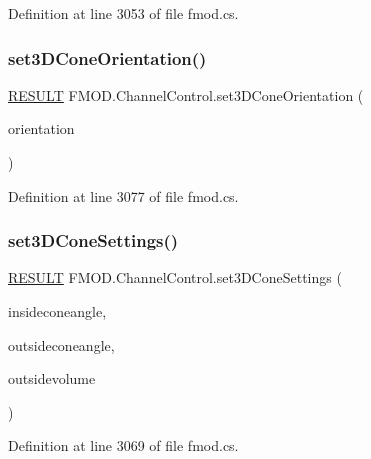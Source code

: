 Definition at line 3053 of file fmod.\+cs.

\mbox{\label{class_f_m_o_d_1_1_channel_control_acee125e81aef0664619c4efdaacda27f}} 
\subsubsection{\texorpdfstring{set3\+D\+Cone\+Orientation()}{set3DConeOrientation()}}
{\footnotesize\ttfamily \hyperlink{namespace_f_m_o_d_a305d1176ef3f8c8815861a60407ac33d}{R\+E\+S\+U\+LT} F\+M\+O\+D.\+Channel\+Control.\+set3\+D\+Cone\+Orientation (\begin{DoxyParamCaption}\item[{ref \hyperlink{struct_f_m_o_d_1_1_v_e_c_t_o_r}{V\+E\+C\+T\+OR}}]{orientation }\end{DoxyParamCaption})}



Definition at line 3077 of file fmod.\+cs.

\mbox{\label{class_f_m_o_d_1_1_channel_control_a4c4b9fe62ea80d0cbdaab3ff51567645}} 
\subsubsection{\texorpdfstring{set3\+D\+Cone\+Settings()}{set3DConeSettings()}}
{\footnotesize\ttfamily \hyperlink{namespace_f_m_o_d_a305d1176ef3f8c8815861a60407ac33d}{R\+E\+S\+U\+LT} F\+M\+O\+D.\+Channel\+Control.\+set3\+D\+Cone\+Settings (\begin{DoxyParamCaption}\item[{float}]{insideconeangle,  }\item[{float}]{outsideconeangle,  }\item[{float}]{outsidevolume }\end{DoxyParamCaption})}



Definition at line 3069 of file fmod.\+cs.

